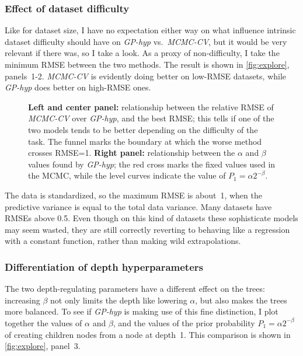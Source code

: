 \documentclass[a4paper]{article}
\theoremstyle{definition}
\newcommand{\widecenter}[1]{\noindent\hspace{-\textwidth}\makebox[3\textwidth][c]{#1}}
\newcommand{\includempl}[1]{\texttt{[image: \#1]}}
\begin{document}
    \subsubsection{Effect of dataset difficulty}
    \label{sec:difficulty}

    Like for dataset size, I have no expectation either way on what influence intrinsic dataset difficulty should have on \emph{GP-hyp} vs.\ \emph{MCMC-CV}, but it would be very relevant if there was, so I take a look. As a proxy of non-difficulty, I take the minimum RMSE between the two methods. The result is shown in \autoref{fig:explore}, panels~1-2. \emph{MCMC-CV} is evidently doing better on low-RMSE datasets, while \emph{GP-hyp} does better on high-RMSE ones.

    \begin{figure}
        \widecenter{\includempl{articleplot5}}
        \caption{\label{fig:explore} \textbf{Left and center panel:} relationship between the relative RMSE of \emph{MCMC-CV} over \emph{GP-hyp}, and the best RMSE; this tells if one of the two models tends to be better depending on the difficulty of the task. The funnel marks the boundary at which the worse method crosses RMSE=1. \textbf{Right panel:} relationship between the $\alpha$ and $\beta$ values found by \emph{GP-hyp}; the red cross marks the fixed values used in the MCMC, while the level curves indicate the value of $P_1=\alpha 2^{-\beta}$.}
    \end{figure}

    The data is standardized, so the maximum RMSE is about~1, when the predictive variance is equal to the total data variance. Many datasets have RMSEs above 0.5. Even though on this kind of datasets these sophisticate models may seem wasted, they are still correctly reverting to behaving like a regression with a constant function, rather than making wild extrapolations.

    \subsubsection{Differentiation of depth hyperparameters}
    \label{sec:diffdepth}

    The two depth-regulating parameters have a different effect on the trees: increasing $\beta$ not only limits the depth like lowering $\alpha$, but also makes the trees more balanced. To see if \emph{GP-hyp} is making use of this fine distinction, I plot together the values of $\alpha$ and $\beta$, and the values of the prior probability $P_1=\alpha 2^{-\beta}$ of creating children nodes from a node at depth~1. This comparison is shown in \autoref{fig:explore}, panel~3.
\end{document}
